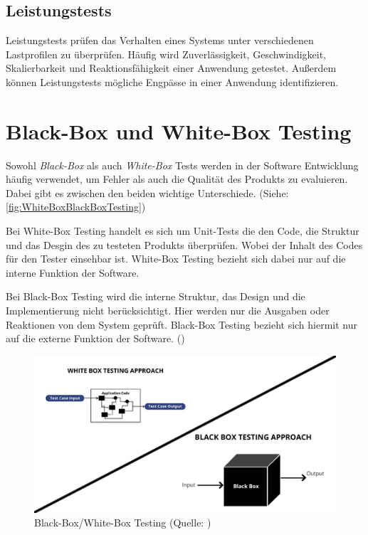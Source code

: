 \documentclass[a4paper, fontsize=11pt, parskip=half, twoside]{scrreprt}
\begin{document}
	\subsection{Leistungstests}
	Leistungstests prüfen das Verhalten eines Systems unter verschiedenen Lastprofilen zu überprüfen. 
	Häufig wird Zuverlässigkeit, Geschwindigkeit, Skalierbarkeit und Reaktionsfähigkeit einer Anwendung getestet. 
	Außerdem können Leistungstests mögliche Engpässe in einer Anwendung identifizieren.
	
	
	\section{Black-Box und White-Box Testing}
	Sowohl \emph{Black-Box} als auch \emph{White-Box} Tests werden in der Software Entwicklung häufig verwendet, um Fehler als auch die Qualität des Produkts zu evaluieren. 
	Dabei gibt es zwischen den beiden wichtige Unterschiede. (Siehe: \autoref{fig:WhiteBoxBlackBoxTesting})
	
	Bei White-Box Testing handelt es sich um Unit-Tests die den Code, die Struktur und das Desgin des zu testeten Produkts überprüfen. 
	Wobei der Inhalt des Codes für den Tester einsehbar ist.
	White-Box Testing bezieht sich dabei nur auf die interne Funktion der Software.
	
	Bei Black-Box Testing wird die interne Struktur, das Design und die Implementierung nicht berücksichtigt.
	Hier werden nur die Ausgaben oder Reaktionen von dem System geprüft.
	Black-Box Testing bezieht sich hiermit nur auf die externe Funktion der Software. (\textcite[Seite 12]{nidhra_black_2012})
	
	\begin{figure}[ht]
		\centering
		\includegraphics[scale=0.6]{assets/WhiteBoxBlackBoxTesting.jpg}
		\caption{Black-Box/White-Box Testing (Quelle: \textcite{khandelwal_difference_2019})}
		\label{fig:WhiteBoxBlackBoxTesting}
	\end{figure}
	
\end{document}
